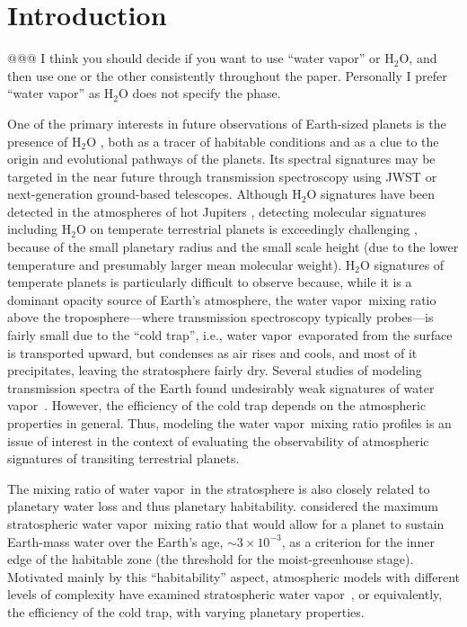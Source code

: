 \documentclass[11pt,numberedappendix,twocolappendix,]{emulateapj}
\def\water{H$_2$O }
\newcommand{\dsa}[1]{{\color{blue}#1}}
\newcommand{\wv}{{\color{orange}water vapor\ }}
\begin{document}

\section{Introduction}
\label{s:intro}

\dsa{@@@ I think you should decide if you want to use ``water vapor'' or H$_2$O, and then use one or the other consistently throughout the paper. Personally I prefer ``water vapor'' as H$_2$O does not specify the phase.}

One of the primary interests in future observations of Earth-sized planets is the presence of \water, both as a tracer of habitable conditions and as a clue to the origin and evolutional pathways of the planets. 
Its spectral signatures may be targeted in the near future through transmission spectroscopy using JWST or next-generation ground-based telescopes.
%
Although \water signatures have been detected in the atmospheres of hot Jupiters \citep[e.g.][]{Sing2016}, detecting molecular signatures including \water on temperate terrestrial planets is exceedingly challenging \citep{Cowan2015}, 
because of the small planetary radius and the small scale height (due to the lower temperature and presumably larger mean molecular weight).  
\water signatures of temperate planets is particularly difficult to observe because, while it is a dominant opacity source of Earth's atmosphere, the \wv  mixing ratio above the troposphere---where transmission spectroscopy typically probes---is fairly small due to the ``cold trap'', i.e., \wv evaporated from the surface is transported upward, but condenses as air rises and cools, and most of it precipitates, leaving the stratosphere fairly dry. 
Several studies of modeling transmission spectra of the Earth found undesirably weak signatures of \wv \citep[e.g.][]{Ehrenreich2006, Kaltenegger2009, Betremieux2013, Misra2014}. 
However, the efficiency of the cold trap depends on the atmospheric properties in general. 
Thus, modeling the \wv mixing ratio profiles is an issue of interest in the context of evaluating the observability of atmospheric signatures of transiting terrestrial planets. 

The mixing ratio of \wv in the stratosphere is also closely related to planetary water loss and thus planetary habitability. 
\citet{Kasting1993} considered the maximum stratospheric \wv mixing ratio that would allow for a planet to sustain Earth-mass water over the Earth's age, $\sim 3 \times 10^{-3}$, as a criterion for the inner edge of the habitable zone (the threshold for the moist-greenhouse stage). 
Motivated mainly by this ``habitability'' aspect, atmospheric models with different levels of complexity have examined stratospheric \wv, or equivalently, the efficiency of the cold trap, with varying planetary properties. 
\end{document}
